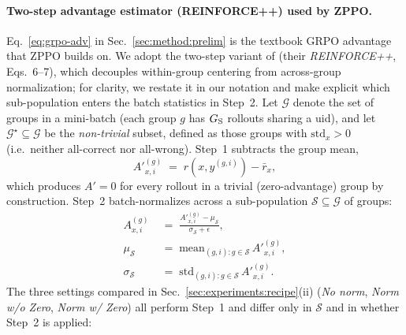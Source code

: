 \paragraph{Two-step advantage estimator (REINFORCE++) used by ZPPO.}
Eq.~\eqref{eq:grpo-adv} in Sec.~\ref{sec:method:prelim} is the textbook GRPO advantage that ZPPO builds on. We adopt the two-step variant of \citet{hu2025reinforce++} (their \emph{REINFORCE++}, Eqs.~6--7), which decouples within-group centering from across-group normalization; for clarity, we restate it in our notation and make explicit which sub-population enters the batch statistics in Step~2. Let $\mathcal{G}$ denote the set of groups in a mini-batch (each group $g$ has $G_{\rm S}$ rollouts sharing a uid), and let $\mathcal{G}^{\star}\!\subseteq\!\mathcal{G}$ be the \emph{non-trivial} subset, defined as those groups with $\mathrm{std}_x\!>\!0$ (i.e.\ neither all-correct nor all-wrong). Step~1 subtracts the group mean,
\begin{equation}
A'^{(g)}_{x,i} \;=\; r(x, y^{(g,i)}) - \bar{r}_x,
\label{eq:adv-step1}
\end{equation}
which produces $A'\!=\!0$ for every rollout in a trivial (zero-advantage) group by construction. Step~2 batch-normalizes across a sub-population $\mathcal{S}\!\subseteq\!\mathcal{G}$ of groups:
\begin{align}
A^{(g)}_{x,i} &\;=\; \frac{A'^{(g)}_{x,i} - \mu_{\mathcal{S}}}{\sigma_{\mathcal{S}} + \epsilon}, \nonumber \\
\mu_{\mathcal{S}} &\;=\; \mathrm{mean}_{(g,i):g\in\mathcal{S}}\,A'^{(g)}_{x,i}, \nonumber \\
\sigma_{\mathcal{S}} &\;=\; \mathrm{std}_{(g,i):g\in\mathcal{S}}\,A'^{(g)}_{x,i}.
\label{eq:adv-step2}
\end{align}
The three settings compared in Sec.~\ref{sec:experiments:recipe}(ii) (\emph{No norm}, \emph{Norm w/o Zero}, \emph{Norm w/ Zero}) all perform Step~1 and differ only in $\mathcal{S}$ and in whether Step~2 is applied:
